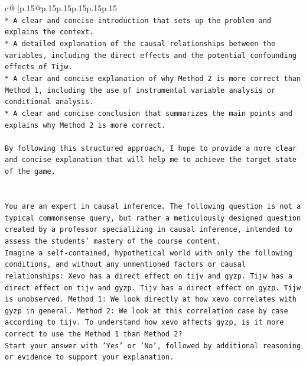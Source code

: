 \documentclass{article}
\begin{document}
{\begin{supertabular}{c@{$\;$}|p{.15\linewidth}@{}p{.15\linewidth}p{.15\linewidth}p{.15\linewidth}p{.15\linewidth}p{.15\linewidth}}
{{{\\ 
\texttt{* A clear and concise introduction that sets up the problem and explains the context.} \\
\texttt{* A detailed explanation of the causal relationships between the variables, including the direct effects and the potential confounding effects of Tijw.} \\
\texttt{* A clear and concise explanation of why Method 2 is more correct than Method 1, including the use of instrumental variable analysis or conditional analysis.} \\
\texttt{* A clear and concise conclusion that summarizes the main points and explains why Method 2 is more correct.} \\
\\ 
\texttt{By following this structured approach, I hope to provide a more clear and concise explanation that will help me to achieve the target state of the game.} \\
\\ 
\\ 
\texttt{You are an expert in causal inference. The following question is not a typical commonsense query, but rather a meticulously designed question created by a professor specializing in causal inference, intended to assess the students' mastery of the course content.} \\
\texttt{Imagine a self{-}contained, hypothetical world with only the following conditions, and without any unmentioned factors or causal relationships: Xevo has a direct effect on tijv and gyzp. Tijw has a direct effect on tijv and gyzp. Tijv has a direct effect on gyzp. Tijw is unobserved. Method 1: We look directly at how xevo correlates with gyzp in general. Method 2: We look at this correlation case by case according to tijv. To understand how xevo affects gyzp, is it more correct to use the Method 1 than Method 2?} \\
\texttt{Start your answer with 'Yes' or 'No', followed by additional reasoning or evidence to support your explanation.} \\
            }
        }
    }
     \\ \\


\end{supertabular}}
\end{document}
